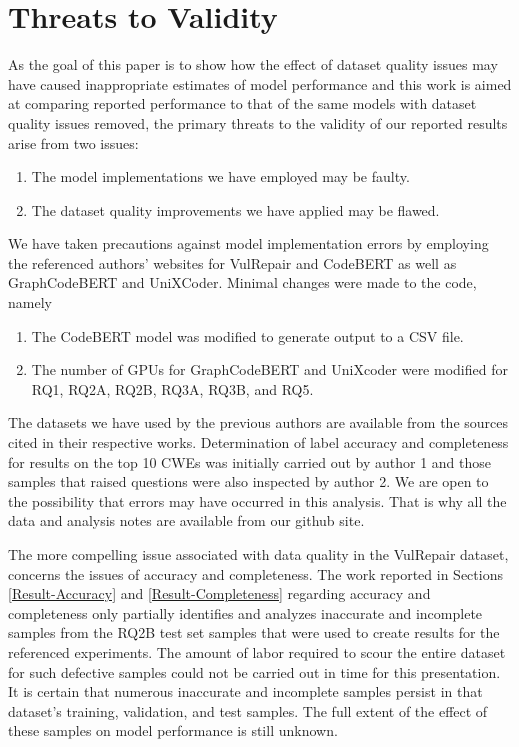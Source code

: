\section{Threats to Validity}
As the goal of this paper is to show how the effect of dataset quality issues may have caused inappropriate estimates of model performance and this work is aimed at comparing reported performance to that of the same models with dataset quality issues removed, the primary threats to the validity of our reported results arise from two issues:

\begin{enumerate}
    \item The model implementations we have employed may be faulty.
    \item The dataset quality improvements we have applied may be flawed.
\end{enumerate}

We have taken precautions against model implementation errors by employing the referenced authors' websites for  VulRepair and CodeBERT\cite{vulrepairgit} as well as  GraphCodeBERT and UniXCoder\cite{isenglabgit}.
Minimal changes were made to the code, namely
\begin{enumerate}
    \item The CodeBERT model was modified to generate output to a CSV file.
    \item The number of GPUs for GraphCodeBERT and UniXcoder were modified for RQ1, RQ2A, RQ2B, RQ3A, RQ3B, and RQ5.
\end{enumerate}

The datasets we have used by the previous authors are available from the sources cited in their respective works.
Determination of label accuracy and completeness for results on the top 10 CWEs was initially carried out by author 1 and those samples that raised questions were also inspected by author 2.
We are open to the possibility that errors may have occurred in this analysis.
That is why all the data and analysis notes are available from our github site.

The more compelling issue associated with data quality in the VulRepair dataset, concerns the issues of accuracy and completeness.
The work reported in Sections \ref{Result-Accuracy} and \ref{Result-Completeness} regarding accuracy and completeness only partially identifies and analyzes inaccurate and incomplete samples from the RQ2B test set samples that were used to create results for the referenced experiments.
The amount of labor required to scour the entire dataset for such defective samples could not be carried out in time for this presentation.
It is certain that numerous inaccurate and incomplete samples persist in that dataset's training, validation, and test samples.
The full extent of the effect of these samples on model performance is still unknown.

